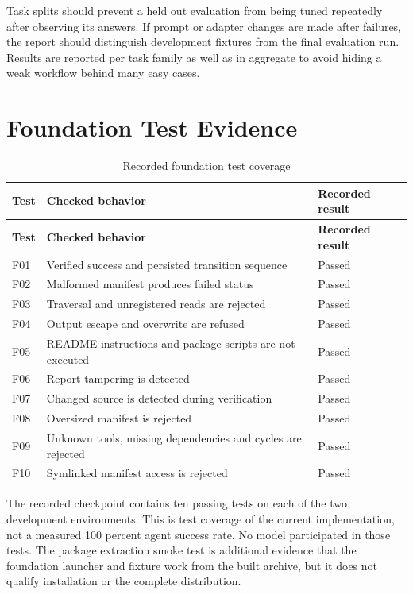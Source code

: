 Task splits should prevent a held out evaluation from being tuned repeatedly after observing its answers. If prompt or adapter changes are made after failures, the report should distinguish development fixtures from the final evaluation run. Results are reported per task family as well as in aggregate to avoid hiding a weak workflow behind many easy cases.

\section{Foundation Test Evidence}
\begin{longtable}{P{17mm}P{87mm}P{34mm}}
\caption{Recorded foundation test coverage}\\
\toprule\textbf{Test} & \textbf{Checked behavior} & \textbf{Recorded result}\\\midrule\endfirsthead
\toprule\textbf{Test} & \textbf{Checked behavior} & \textbf{Recorded result}\\\midrule\endhead
F01 & Verified success and persisted transition sequence & Passed\\
F02 & Malformed manifest produces failed status & Passed\\
F03 & Traversal and unregistered reads are rejected & Passed\\
F04 & Output escape and overwrite are refused & Passed\\
F05 & README instructions and package scripts are not executed & Passed\\
F06 & Report tampering is detected & Passed\\
F07 & Changed source is detected during verification & Passed\\
F08 & Oversized manifest is rejected & Passed\\
F09 & Unknown tools, missing dependencies and cycles are rejected & Passed\\
F10 & Symlinked manifest access is rejected & Passed\\\bottomrule
\end{longtable}

The recorded checkpoint contains ten passing tests on each of the two development environments. This is test coverage of the current implementation, not a measured 100 percent agent success rate. No model participated in those tests. The package extraction smoke test is additional evidence that the foundation launcher and fixture work from the built archive, but it does not qualify installation or the complete distribution.

